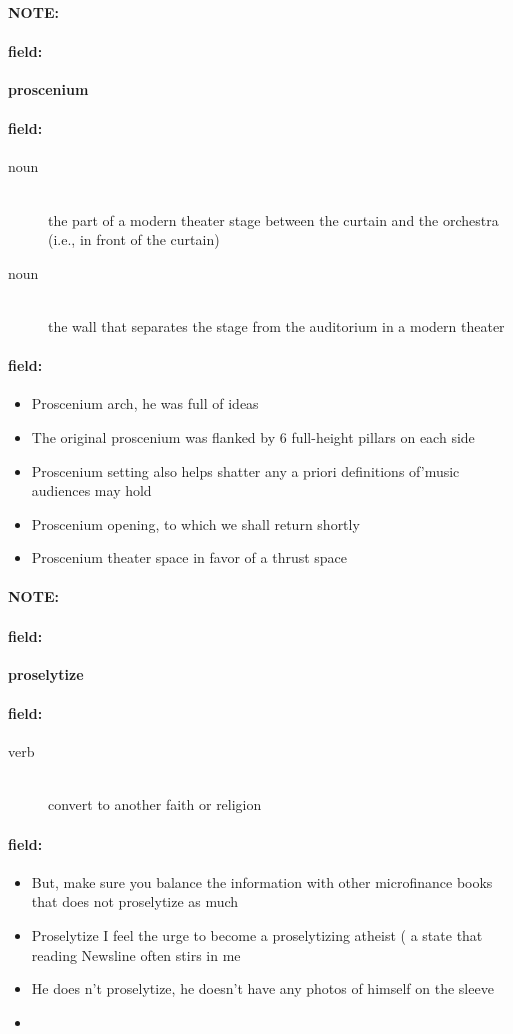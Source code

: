 \documentclass[12pt]{article}
\newenvironment{note}{\paragraph{NOTE:}}{}
\newenvironment{field}{\paragraph{field:}}{}
\begin{document}
\begin{note}
\begin{field}
\textbf{\large proscenium}
\end{field}


\begin{field}
\begin{description}
\item[noun] \hfill \\ 
the part of a modern theater stage between the curtain and the orchestra (i.e., in front of the curtain)

\item[noun] \hfill \\ 
the wall that separates the stage from the auditorium in a modern theater

\end{description}
\end{field}

\begin{field}
\begin{itemize}
\item Proscenium arch, he was full of ideas
\item The original proscenium was flanked by 6 full-height pillars on each side
\item Proscenium setting also helps shatter any a priori definitions of'music audiences may hold
\item Proscenium opening, to which we shall return shortly
\item Proscenium theater space in favor of a thrust space
\end{itemize}
\end{field}
\end{note}
\begin{note}
\begin{field}
\textbf{\large proselytize}
\end{field}


\begin{field}
\begin{description}
\item[verb] \hfill \\ 
convert to another faith or religion

\end{description}
\end{field}

\begin{field}
\begin{itemize}
\item But, make sure you balance the information with other microfinance books that does not proselytize as much
\item Proselytize I feel the urge to become a proselytizing atheist ( a state that reading Newsline often stirs in me
\item He does n't proselytize, he doesn't have any photos of himself on the sleeve
\item 
\end{itemize}
\end{field}
\end{note}
\end{document}
